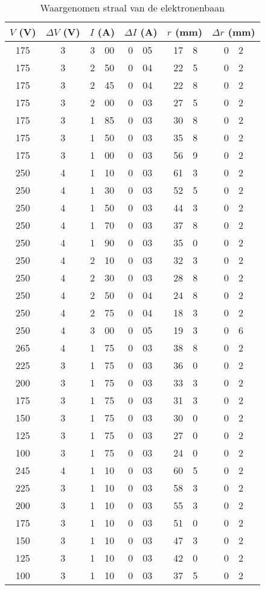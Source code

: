 \begin{table}
\caption{Waargenomen straal van de elektronenbaan}
\label{tabel-elektron}
\begin{center}
\begin{tabular}{c|c|r@{.}l|r@{.}l|r@{.}l|r@{.}l}
\multicolumn{1}{c|}{$V$ (V)}&
\multicolumn{1}{c|}{$\Delta V$ (V)}&
\multicolumn{2}{c|}{$I$ (A)}&
\multicolumn{2}{c|}{$\Delta I$ (A)}&
\multicolumn{2}{c|}{$r$ (mm)}&
\multicolumn{2}{c}{$\Delta r$ (mm)}\\\hline
175&	3&	3&00&	0&05&	17&8&	0&2\\
175&	3&	2&50&	0&04&	22&5&	0&2\\
175&	3&	2&45&	0&04&	22&8&	0&2\\
175&	3&	2&00&	0&03&	27&5&	0&2\\
175&	3&	1&85&	0&03&	30&8&	0&2\\
175&	3&	1&50&	0&03&	35&8&	0&2\\
175&	3&	1&00&	0&03&	56&9&	0&2\\\hline
250&	4&	1&10&	0&03&	61&3&	0&2\\
250&	4&	1&30&	0&03&	52&5&	0&2\\
250&	4&	1&50&	0&03&	44&3&	0&2\\
250&	4&	1&70&	0&03&	37&8&	0&2\\
250&	4&	1&90&	0&03&	35&0&	0&2\\
250&	4&	2&10&	0&03&	32&3&	0&2\\
250&	4&	2&30&	0&03&	28&8&	0&2\\
250&	4&	2&50&	0&04&	24&8&	0&2\\
250&	4&	2&75&	0&04&	18&3&	0&2\\
250&	4&	3&00&	0&05&	19&3&	0&6\\\hline
265&	4&	1&75&	0&03&	38&8&	0&2\\
225&	3&	1&75&	0&03&	36&0&	0&2\\
200&	3&	1&75&	0&03&	33&3&	0&2\\
175&	3&	1&75&	0&03&	31&3&	0&2\\
150&	3&	1&75&	0&03&	30&0&	0&2\\
125&	3&	1&75&	0&03&	27&0&	0&2\\
100&	3&	1&75&	0&03&	24&0&	0&2\\\hline
245&	4&	1&10&	0&03&	60&5&	0&2\\
225&	3&	1&10&	0&03&	58&3&	0&2\\
200&	3&	1&10&	0&03&	55&3&	0&2\\
175&	3&	1&10&	0&03&	51&0&	0&2\\
150&	3&	1&10&	0&03&	47&3&	0&2\\
125&	3&	1&10&	0&03&	42&0&	0&2\\
100&	3&	1&10&	0&03&	37&5&	0&2\\
\end{tabular}
\end{center}
\end{table}
